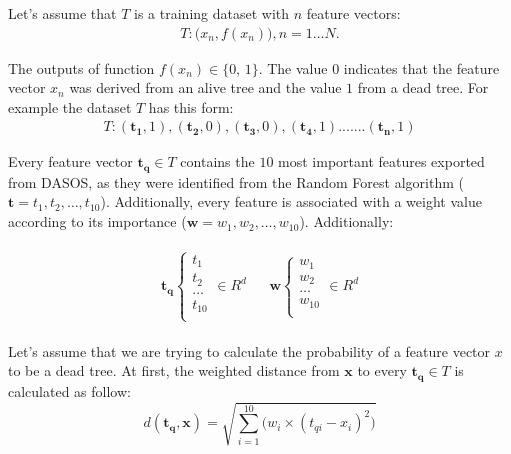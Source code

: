 \documentclass{subfiles}
\begin{document}
\par Let’s assume that  $T$ is a training dataset with $n$ feature vectors:
\begin{eqnarray}
T  : \big(x_n, f(x_n) \big), n=1\dots N. 
\end{eqnarray}

The outputs of function $f(x_n) \in \{\textrm{0, 1} \}$. The value $0$ indicates that the feature vector $x_n$ was derived from an alive tree and the value $1$ from a dead tree. For example the dataset $T$ has this form:
\begin{eqnarray}
T : (\boldsymbol{t_1}, 1), (\boldsymbol{t_2}, 0), (\boldsymbol{t_3}, 0), (\boldsymbol{t_4}, 1) . ...... (\boldsymbol{t_n}, 1)
\end{eqnarray}

\par Every feature vector  $\boldsymbol{t_q} \in T$ contains the $10$ most important features exported from DASOS, as they were identified from the Random Forest algorithm ($\boldsymbol{t}={t_1, t_2, \dots , t_10}$). Additionally, every feature is associated with a weight value according to its importance ($\boldsymbol{w}={w_1,w_2, \dots ,w_10} $). Additionally:


\begin{gather*}
\begin{align}
\boldsymbol{t_q} 
\begin{cases}
t_1\\    
t_2\\
\dots \\
t_{10} \\ 
\end{cases}
\in R^d &  & \boldsymbol{w}
\begin{cases}
w_1\\    
w_2\\
\dots \\
w_{10} \\    
\end{cases}
\in R^d 
\end{align}
\end{gather*}


\par Let's assume that we are trying to calculate the probability of a feature vector $x$ to be a dead tree. At first, the weighted distance from $\boldsymbol{x}$ to every $\boldsymbol{t_q} \in T$ is calculated as follow:
\begin{equation} 
d(\boldsymbol{t_q},\boldsymbol{x}) = \sqrt{\sum_{i=1}^{10}{ \Big(w_i \times (t_{qi}-x_i)^2 \Big)}}
\end{equation}
\end{document}
